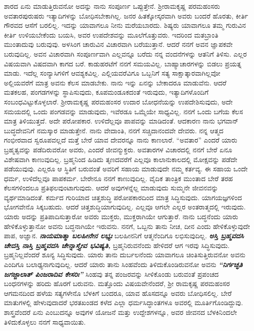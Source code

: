 ಶಾರದ ಏನು ಮಾಡುತ್ತಿರುವನೋ ಅದನ್ನು ನಾನು ಸಂಪೂರ್ಣ ಒಪ್ಪುತ್ತೇನೆ. ಶ‍್ರೀರಾಮ\break ಕೃಷ್ಣ ಪರಮಹಂಸರು ಅವತಾರಪುರುಷರು ಇತ್ಯಾದಿಗಳನ್ನು ಬೋಧಿಸಬೇಕಾಗಿಲ್ಲ. ಜನರ ಹಿತಕ್ಕೋಸ್ಕರವಾಗಿ ಅವರು ಬಂದರೆ ಹೊರತು, ಕೀರ್ತಿ ಗೌರವದ ಆಸೆಗೆ ಬರಲಿಲ್ಲ. ಇದನ್ನು ಯಾವಾಗಲೂ ನೀನು ಮರೆಯಬಾರದು. ಶಿಷ್ಯರು ಯಾವಾಗಲೂ ತಮ್ಮ ಗುರುವಿನ ಕೀರ್ತಿ ಉಳಿಯಬೇಕೆಂದು ಬಯಸಿ, ಅವರ ಉಪದೇಶವನ್ನು ಮೂಲೆಗೊತ್ತುವರು. ಇದರಿಂದ ಮತಬ್ರಾಂತಿ ಮುಂತಾದುವು ಬರುವುವು. ಅಳಸಿಂಗ ಚಾರುವಿನ ವಿಚಾರವಾಗಿ ಬರೆಯುತ್ತಾನೆ. ಆದರೆ ನನಗೆ ಅವನ ಜ್ಞಾಪಕವೇ ಬರುವುದಿಲ್ಲ. ಅವನ ವಿಚಾರವಾಗಿ ಸಂಪೂರ್ಣವಾಗಿ ಎಲ್ಲವನ್ನೂ ಬರೆದು ನನ್ನ ವಂದನೆಗಳನ್ನು ಆತನಿಗೆ ತಿಳಿಸು. ಎಲ್ಲರ ವಿಷಯವಾಗಿ ವಿಷದವಾಗಿ ಕಾಗದ ಬರೆ. ಕಾಡುಹರಟೆಗೆ ನನಗೆ ಸಮಯವಿಲ್ಲ. ಬಾಹ್ಯಾಚಾರಗಳನ್ನು ಬಿಡಲು ಪ್ರಯತ್ನ ಮಾಡು. ಇದೆಲ್ಲ ಸಂನ್ಯಾಸಿಗಳಿಗೆ ಆವಶ್ಯಕವಿಲ್ಲ. ಎಲ್ಲಿಯವರೆವಿಗೂ ಒಬ್ಬನಿಗೆ ಸತ್ಯ ಸಾಕ್ಷಾತ್ಕಾರವಾಗಿಲ್ಲವೋ ಅಲ್ಲಿಯವರೆಗೆ ಮಾತ್ರ ಅವನು ಕೆಲಸ ಮಾಡಬೇಕು. ನಾನು ಇನ್ನು ಏನನ್ನು ಬೇಕಾದರೂ ಮಾಡುವೆನು. ಆದರೆ ಮತಕಲಹ, ಪಂಗಡಗಳನ್ನು ಸ್ಥಾಪಿಸುವುದು, ಕೂಪಮಂಡೂಕದಂತೆ ಇರುವುದು, ಇತ್ಯಾದಿಗಳೊಂದಿಗೆ ಸಂಬಂಧವಿಟ್ಟುಕೊಳ್ಳಲಾರೆ. ಶ‍್ರೀರಾಮಕೃಷ್ಣ ಪರಮಹಂಸರ ಉದಾರ ಬೋಧನೆಯನ್ನು ಉಪದೇಶಿಸುವುದು, ಅದೇ ಸಮಯದಲ್ಲಿ ಒಂದು ಪಂಗಡವನ್ನು ಮಾಡುವುದು, ಇವೆರಡೂ ಒಮ್ಮೆಯೇ ಸಾಧ್ಯವಿಲ್ಲ. ನನಗೆ ಒಂದು ಬಗೆಯ ಕೆಲಸ ಮಾತ್ರ ತಿಳಿಯುತ್ತದೆ. ಅದೇ ಪರೋಪಕಾರ. ಉಳಿದೆಲ್ಲವೂ ಪಾಪವನ್ನು ಮಾಡಿದಂತೆ. ಆದಕಾರಣ ನಾನು ಭಗವಾನ್ ಬುದ್ಧದೇವನಿಗೆ ನಮಸ್ಕಾರ ಮಾಡುತ್ತೇನೆ. ನಾನು ವೇದಾಂತಿ, ನನಗೆ ಸಚ್ಚಿದಾನಂದವೇ ದೇವರು. ನನ್ನ ಆತ್ಮದ ಗಂಭೀರವಾದ ಸ್ವರೂಪವಲ್ಲದೆ ಮತ್ತೆ ಬೇರೆ ಯಾವ ದೇವರನ್ನೂ ನಾನು ಕಾಣಲಾರೆ. “ಅವತಾರ” ಎಂದರೆ ಯಾರು ಬ್ರಹ್ಮತ್ವವನ್ನು ಪಡೆದಿರುವರೋ ಅವರು, ಎಂದರೆ ಜೀವನ್ಮುಕ್ತರು. ಅವತಾರಗಳ ವಿಚಾರದಲ್ಲಿ ನನಗೆ ಬೇರೆ ಏನೂ ವಿಶೇಷವಾಗಿ ಕಾಣುವುದಿಲ್ಲ. ಬ್ರಹ್ಮನಿಂದ ಹಿಡಿದು ತೃಣದವರೆಗೆ ಎಲ್ಲವೂ ಕಾಲಾನುಕಾಲದಲ್ಲಿ ಮೋಕ್ಷವನ್ನು ಪಡೆದೇ ಪಡೆಯುವುವು. ಎಲ್ಲರೂ ಆ ಸ್ಥಿತಿಗೆ ಬರುವಂತೆ ಅವರಿಗೆ ಸಹಾಯ ಮಾಡುವುದೇ ನಮ್ಮ ಕರ್ತವ್ಯ. ಈ ಸಹಾಯ ಒಂದೇ ಧರ್ಮ, ಉಳಿದೆಲ್ಲವೂ ಪಾಪಕರ್ಮ. ಬೇರೇನೂ ನನಗೆ ಕಾಣುವುದಿಲ್ಲ. ವೈದಿಕ ತಾಂತ್ರಿಕ ಮುಂತಾದ ಬೇರೆ ತರಹ ಕೆಲಸಗಳಿಂದಲೂ ಪ್ರತಿಫಲವುಂಟಾಗುವುದು. ಆದರೆ ಅವುಗಳನ್ನೆಲ್ಲ ಮಾಡುವುದು ಸುಮ್ಮನೇ ಜೀವನವನ್ನು ವ್ಯರ್ಥಮಾಡಿದಂತೆ. ಕರ್ಮದ ಗುರಿಯಾದ ಚಿತ್ತಶುದ್ಧಿ ಪರೋಪಕಾರದಿಂದ ಮಾತ್ರ ಸಿದ್ಧಿಸುವುದು. ಯಾಗಯಜ್ಞಗಳಿಂದ ಭೋಗವೇನೊ ಸಿಕ್ಕಬಹುದು. ಆದರೆ ಚಿತ್ತಶುದ್ಧಿಯಾಗುವುದಿಲ್ಲ. ಎಲ್ಲವೂ ಆಗಲೇ ಎಲ್ಲರ ಅಂತರಾತ್ಮದಲ್ಲಿ ಇರುವುದು. ಯಾರು ಅದನ್ನು ಪ್ರತಿಪಾದಿಸುತ್ತಾರೋ ಅವರು ಮುಕ್ತರು, ಮುಕ್ತರಾಗಿಯೇ ಆಗುತ್ತಾರೆ. ನಾನು ಬದ್ಧನೆಂದು ಯಾರು ಹೇಳಿಕೊಳ್ಳುತ್ತಾನೋ ಅವನು ಬದ್ಧನಾಗಿಯೇ ಇರುವನು. ನನಗೆ, ಒಬ್ಬನು ತಾನು ನೀಚ, ದೀನ ಎಂದು ಹೇಳಿಕೊಳ್ಳುವುದೇ ಪಾಪ, ಅಜ್ಞಾನ. \textbf{\textit{ನಾಯಮಾತ್ಮಾ ಬಲಹೀನೇನ ಲಭ್ಯಃ}} ಬಲಹೀನನಿಗೆ ಆತ್ಮನೆಂದಿಗೂ ಲಭಿಸುವುದಿಲ್ಲ. \textbf{\textit{ಅಸ್ತಿ ಬ್ರಹ್ಮವದಸಿ ಚೇದಸ್ತಿ ನಾಸ್ತಿ ಬ್ರಹ್ಮವದಸಿ ಚೇನ್ನಾಸ್ತ್ಯೇವ ಭವಿಷ್ಯತಿ, }} ಬ್ರಹ್ಮನಿರುವನೆಂದು ಹೇಳಿದರೆ ಆಗ ಇರವು ಸಿದ್ಧಿಸುವುದು. ಬ್ರಹ್ಮನಿಲ್ಲವೆಂದರೆ ಶೂನ್ಯ ಸಿದ್ಧಿಸುವುದು. ಯಾರು ತಾನು ದುರ್ಬಲನೆಂದು ಯಾವಾಗಲೂ ಚಿಂತಿಸುತ್ತಿರುವನೋ ಅವನು ಎಂದಿಗೂ ಬಲಾಢ್ಯನಾಗುವುದಿಲ್ಲ. ಆದರೆ ಯಾರು ತಾನು ಸಿಂಹವೆಂದು ತಿಳಿದುಕೊಂಡಿರುವನೋ ಅವನು \textbf{\textit{“ನಿರ್ಗಚ್ಛತಿ ಜಗಜ್ಜಾಲಾತ್ ಪಿಂಜರಾದಿವ ಕೇಸರಿಃ”}}\enginline{-} ಸಿಂಹವು ತನ್ನ ಪಂಜರವನ್ನು ಸೀಳಿಕೊಂಡು ಬರುವಂತೆ ಪ್ರಪಂಚದ ಬಂಧನಗಳನ್ನು ಹರಿದು ಹೊರಗೆ ಬರುವನು. ಮತ್ತೊಂದು ವಿಷಯವೇನೆಂದರೆ, ಶ‍್ರೀ ರಾಮಕೃಷ್ಣ ಪರಮಹಂಸರ ಆಗಮನದಿಂದ ಹಳೆಯ ಸತ್ಯಗಳೇನೊ ಬೆಳಕಿಗೆ ಬಂದರೂ, ಯಾವ ಹೊಸದನ್ನೂ ಅವರು ಬೋಧಿಸಲಿಲ್ಲ. ಬೇರೆ ಮಾತುಗಳಲ್ಲಿ ಹೇಳುವುದಾದರೆ ಭರತಖಂಡದ ಕಳೆದ ಎಲ್ಲಾ ಧರ್ಮಸಿದ್ಧಾಂತಗಳೂ ಅವರಲ್ಲಿ ಮೂರ್ತಿಗೊಂಡಿದ್ದುವು. ಶಾಸ್ತ್ರವೆಂದರೆ ಏನು ಎಂಬುದನ್ನೂ ಅವುಗಳ ಯೋಜನೆ ಮತ್ತು ಉದ್ದೇಶಗಳನ್ನೂ, ಅವರ ಜೀವನದ ಬೆಳಕಿನಿಂದಲೇ ತಿಳಿದುಕೊಳ್ಳಲು ನನಗೆ ಸಾಧ್ಯವಾಯಿತು.

